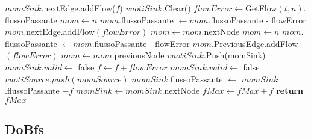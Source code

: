 \documentclass{article}
\begin{document}
\begin{algorithm}
    \begin{algorithmic}
        \STATE $momSink$.nextEdge.addFlow($f$)
        \STATE $vuotiSink.$Clear()
        \STATE $flowError \leftarrow $GetFlow$(t,n).$flussoPassante
        \STATE $mom \leftarrow n$
        \STATE $mom.$flussoPassante $\leftarrow mom.$flussoPassante - flowError
        \STATE $mom.$nextEdge.addFlow$(flowError)$
        \STATE $mom \leftarrow mom.$nextNode
        \ENDWHILE
        \STATE $mom \leftarrow n$
        \STATE $mom.$flussoPassante $\leftarrow mom.$flussoPassante - flowError
        \STATE $mom.$PreviousEdge.addFlow$(flowError)$
        \STATE $mom \leftarrow mom.$previousNode
        \ENDWHILE
        \STATE $vuotiSink.$Push(momSink)
        \STATE $momSink.valid \leftarrow$ false
        \STATE $f \leftarrow f + flowError$
        \STATE $momSink.valid \leftarrow$ false
        \STATE $vuotiSource.push(momSource)$
        \ENDIF
        \STATE $momSink$.flussoPassante $\leftarrow$ $momSink$.flussoPassante $-f$
        \STATE $momSink \leftarrow momSink.$nextNode
        \ENDWHILE
        \STATE $fMax \leftarrow fMax + f$
        \ENDWHILE
        \STATE \textbf{return} $fMax$
    \end{algorithmic}
\end{algorithm}

\subsection{DoBfs}
\end{document}
